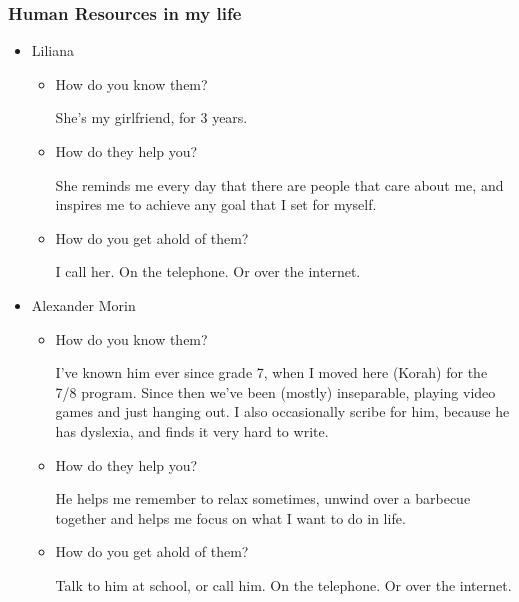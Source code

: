 \documentclass[11pt]{article}
\begin{document}
\subsubsection*{Human Resources in my life}
\label{sec:orga8dd1f2}
\begin{itemize}
\item Liliana
\label{sec:org0fa049f}
\begin{itemize}
\item How do you know them?
\label{sec:org5690a93}

She's my girlfriend, for 3 years.

\item How do they help you?
\label{sec:org4be6e66}

She reminds me every day that there are people that care about me, and inspires me to achieve any goal that I set for myself.

\item How do you get ahold of them?
\label{sec:org33a203c}

I call her. On the telephone. Or over the internet.
\end{itemize}

\item Alexander Morin
\label{sec:orgc6cc950}
\begin{itemize}
\item How do you know them?
\label{sec:orgc639fc5}

I've known him ever since grade 7, when I moved here (Korah) for the 7/8 program. Since then we've been (mostly) inseparable, playing video games and just hanging out. I also occasionally scribe for him, because he has dyslexia, and finds it very hard to write.

\item How do they help you?
\label{sec:org5e6e261}

He helps me remember to relax sometimes, unwind over a barbecue together and helps me focus on what I want to do in life.

\item How do you get ahold of them?
\label{sec:org936ec2c}

Talk to him at school, or call him. On the telephone. Or over the internet.
\end{itemize}
\end{itemize}
\end{document}
